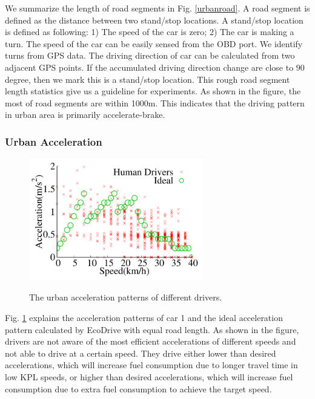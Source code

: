 We summarize the length of road segments in Fig. \ref{urbanroad}.
A road segment is defined as the distance between two stand/stop locations. 
A stand/stop location is defined as following: 
1) The speed of the car is zero; 2) The car is making a turn. 
The speed of the car can be easily sensed from the OBD port. 
We identify turns from GPS data. 
The driving direction of car can be calculated from two adjacent GPS points. 
If the accumulated driving direction change are close to $90$ degree, 
then we mark this is a stand/stop location. 
This rough road segment length statistics give us a 
guideline for experiments. 
As shown in the figure, the most of road segments are within 1000m.
This indicates that the driving pattern in urban area is primarily  
accelerate-brake. 


\subsubsection{Urban Acceleration}



\begin{figure}[!htbp]
\begin{center}
\includegraphics[width=3.0in,angle=0]{Figs/EcoDrive/evaluation/real_opt_acce_single.pdf}
\vspace{-0.0cm}
\caption{The urban acceleration patterns of different drivers.}
\vspace{-0.5cm}
\label{urbanaccelerations}
\end{center}
\end{figure}

Fig. \ref{urbanaccelerations} explains the acceleration patterns of
car 1 and the ideal acceleration pattern calculated by EcoDrive
with equal road length. 
As shown in the figure, drivers are not aware of the most efficient
accelerations of different speeds and not able to drive at a certain speed. 
They drive either lower than
desired accelerations, which will increase fuel consumption
due to longer travel time in low KPL speeds, 
or higher than desired accelerations, 
which will increase fuel consumption due to extra fuel consumption
to achieve the target speed. 



